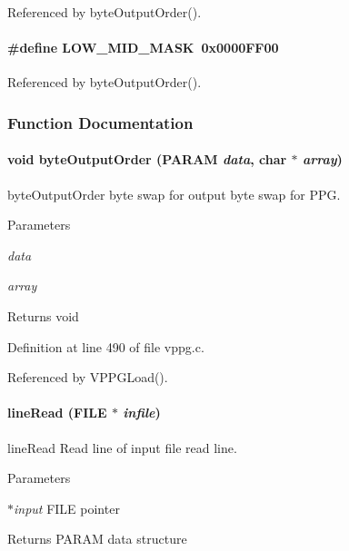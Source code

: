 Referenced by byteOutputOrder().
\paragraph[{LOW\_\-MID\_\-MASK}]{\setlength{\rightskip}{0pt plus 5cm}\#define LOW\_\-MID\_\-MASK~0x0000FF00}\hfill\label{vppg_8c_a2db26da6c61be485e42ccd9b5d4db796}


Referenced by byteOutputOrder().

\subsubsection{Function Documentation}
\paragraph[{byteOutputOrder}]{\setlength{\rightskip}{0pt plus 5cm}void byteOutputOrder ({\bf PARAM} {\em data}, \/  char $\ast$ {\em array})}\hfill\label{vppg_8c_a75ca53aa4c6983bef5186a0138854857}
byteOutputOrder byte swap for output  byte swap for PPG. 
\begin{DoxyParams}{Parameters}
\item[{\em data}]\item[{\em array}]\end{DoxyParams}
\begin{DoxyReturn}{Returns}
void 
\end{DoxyReturn}


Definition at line 490 of file vppg.c.

Referenced by VPPGLoad().
\paragraph[{lineRead}]{ lineRead (FILE $\ast$ {\em infile})}\hfill\label{vppg_8c_af4b7a92a95e005bb1ec7e30fc56724c3}
lineRead Read line of input file  read line. 
\begin{DoxyParams}{Parameters}
\item[{\em $\ast$input}]FILE pointer \end{DoxyParams}
\begin{DoxyReturn}{Returns}
PARAM data structure 
\end{DoxyReturn}


